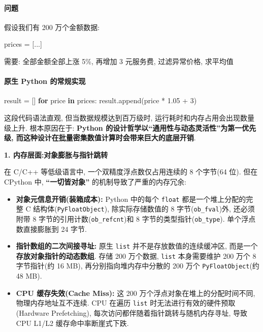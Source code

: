 \documentclass[11pt]{article}
\providecommand{\tightlist}{%
      \setlength{\itemsep}{0pt}\setlength{\parskip}{0pt}}
\newenvironment{Shaded}{}{}
\newcommand{\KeywordTok}[1]{\textcolor[rgb]{0.00,0.44,0.13}{\textbf{{#1}}}}
\newcommand{\DecValTok}[1]{\textcolor[rgb]{0.25,0.63,0.44}{{#1}}}
\newcommand{\FloatTok}[1]{\textcolor[rgb]{0.25,0.63,0.44}{{#1}}}
\newcommand{\NormalTok}[1]{{#1}}
\newcommand{\ControlFlowTok}[1]{\textcolor[rgb]{0.00,0.44,0.13}{\textbf{{#1}}}}
\newcommand{\OperatorTok}[1]{\textcolor[rgb]{0.40,0.40,0.40}{{#1}}}
\begin{document}
    \paragraph{问题}\label{ux95eeux9898}

    假设我们有 200 万个金额数据:

\begin{Shaded}
\begin{Highlighting}[]
\NormalTok{prices }\OperatorTok{=}\NormalTok{ [...]}
\end{Highlighting}
\end{Shaded}

需要: 全部金额全部上涨 5\%, 再增加 3 元服务费, 过滤异常价格, 求平均值

    \paragraph{原生 Python
的常规实现}\label{ux539fux751f-python-ux7684ux5e38ux89c4ux5b9eux73b0}

    \begin{Shaded}
\begin{Highlighting}[]
\NormalTok{result }\OperatorTok{=}\NormalTok{ []}
\ControlFlowTok{for}\NormalTok{ price }\KeywordTok{in}\NormalTok{ prices:}
\NormalTok{    result.append(price }\OperatorTok{*} \FloatTok{1.05} \OperatorTok{+} \DecValTok{3}\NormalTok{)}
\end{Highlighting}
\end{Shaded}

这段代码语法直观, 但当数据规模达到百万级时,
运行耗时和内存占用会出现数量级上升. 根本原因在于: \textbf{Python
的设计哲学以``通用性与动态灵活性''为第一优先级,
而这种设计在批量密集数值计算时会带来巨大的底层开销}.

\textbf{1. 内存层面:对象膨胀与指针跳转}

在 C/C++ 等低级语言中, 一个双精度浮点数仅占用连续的 8 个字节(64 位).
但在 CPython 中, \textbf{``一切皆对象''} 的机制导致了严重的内存冗余:

\begin{itemize}
\tightlist
\item
  \textbf{对象元信息开销(装箱成本):} Python 中的每个 \texttt{float}
  都是一个堆上分配的完整 C 结构体(\texttt{PyFloatObject}),
  除实际存储数值的 8 字节(\texttt{ob\_fval})外, 还必须附带 8
  字节的引用计数(\texttt{ob\_refcnt})和 8
  字节的类型指针(\texttt{ob\_type}). 单个浮点数直接膨胀到 24 字节.
\item
  \textbf{指针数组的二次间接寻址:} 原生 \texttt{list}
  并不是存放数值的连续缓冲区, 而是一个\textbf{存放对象指针的动态数组}.
  存储 200 万个数据, \texttt{list} 本身需要维护 200 万个 8 字节指针(约
  16 MB), 再分别指向堆内存中分散的 200 万个 \texttt{PyFloatObject}(约 48
  MB).
\item
  \textbf{CPU 缓存失效(Cache Miss):} 这 200
  万个浮点对象在堆上的分配时间不同, 物理内存地址互不连续. CPU 在遍历
  \texttt{list} 时无法进行有效的硬件预取(Hardware Prefetching),
  每次访问都伴随着指针跳转与随机内存寻址, 导致 CPU L1/L2
  缓存命中率断崖式下跌.
\end{itemize}
\end{document}
